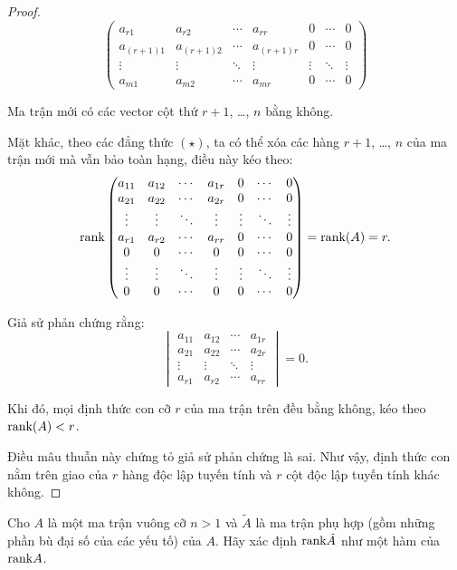 \documentclass[class=linear-algebra,crop=false]{standalone}
\begin{document}
\begin{proof}
\[\begin{pmatrix}
			a_{r1}     & a_{r2}     & \cdots & a_{rr}     & 0      & \cdots & 0      \\
			a_{(r+1)1} & a_{(r+1)2} & \cdots & a_{(r+1)r} & 0      & \cdots & 0      \\
			\vdots     & \vdots     & \ddots & \vdots     & \vdots & \ddots & \vdots \\
			a_{m1}     & a_{m2}     & \cdots & a_{mr}     & 0      & \cdots & 0
		\end{pmatrix}
	\]
	\par Ma trận mới có các vector cột thứ $r+1$, \ldots, $n$ bằng không.
	\par Mặt khác, theo các đẳng thức $(\star)$, ta có thể xóa các hàng $r+1$, \ldots, $n$ của ma trận mới mà vẫn bảo toàn hạng, điều này kéo theo:
	\[
		\text{rank}
		\begin{pmatrix}
			a_{11} & a_{12} & \cdots & a_{1r} & 0      & \cdots & 0      \\
			a_{21} & a_{22} & \cdots & a_{2r} & 0      & \cdots & 0      \\
			\vdots & \vdots & \ddots & \vdots & \vdots & \ddots & \vdots \\
			a_{r1} & a_{r2} & \cdots & a_{rr} & 0      & \cdots & 0      \\
			0      & 0      & \cdots & 0      & 0      & \cdots & 0      \\
			\vdots & \vdots & \ddots & \vdots & \vdots & \ddots & \vdots \\
			0      & 0      & \cdots & 0      & 0      & \cdots & 0
		\end{pmatrix}
		= \text{rank}(A) = r.
	\]
	\par Giả sử phản chứng rằng:
	\[
		\begin{vmatrix}
			a_{11} & a_{12} & \cdots & a_{1r} \\
			a_{21} & a_{22} & \cdots & a_{2r} \\
			\vdots & \vdots & \ddots & \vdots \\
			a_{r1} & a_{r2} & \cdots & a_{rr}
		\end{vmatrix} = 0.
	\]
	\par Khi đó, mọi định thức con cỡ $r$ của ma trận trên đều bằng không, kéo theo $\text{rank}(A) < r$.
	\par Điều mâu thuẫn này chứng tỏ giả sử phản chứng là sai. Như vậy, định thức con nằm trên giao của $r$ hàng độc lập tuyến tính và $r$ cột độc lập tuyến tính khác không.
\end{proof}

\begin{exercise}
	\par Cho $A$ là một ma trận vuông cỡ $n > 1$ và $\tilde{A}$ là ma trận phụ hợp (gồm những phần bù đại số của các yếu tố) của $A$. Hãy xác định $\text{rank}\tilde{A}$ như một hàm của $\text{rank} A$.
\end{exercise}
\end{document}
